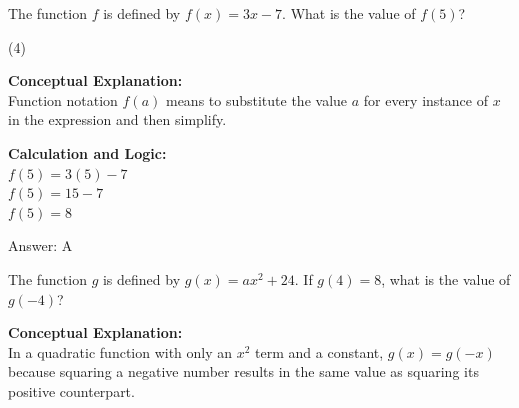 \documentclass[11pt,paper=a4,answers]{exam}
\begin{document}
\begin{questions}
\pointsinrightmargin
\pointsdroppedatright
\marksnotpoints
{}
\pointformat{\boldmath\themarginpoints}
\bracketedpoints



\question
The function $f$ is defined by $f(x) = 3x - 7$. What is the value of $f(5)$?
\begin{tasks}(4)
\end{tasks}

\begin{solution}
\textbf{Conceptual Explanation:} \\
Function notation $f(a)$ means to substitute the value $a$ for every instance of $x$ in the expression and then simplify.

\vspace{20pt}

\textbf{Calculation and Logic:} \\
$f(5) = 3(5) - 7$ \\
$f(5) = 15 - 7$ \\
$f(5) = 8$

\vspace{25pt}

Answer: \colorbox{yellow!100}{A}
\end{solution}

\vspace{40pt}

\question
The function $g$ is defined by $g(x) = ax^2 + 24$. If $g(4) = 8$, what is the value of $g(-4)$?

\begin{solution}
\textbf{Conceptual Explanation:} \\
In a quadratic function with only an $x^2$ term and a constant, $g(x) = g(-x)$ because squaring a negative number results in the same value as squaring its positive counterpart.

\vspace{20pt}


\end{solution}
\end{questions}
\end{document}
